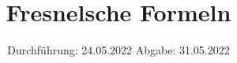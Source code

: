 

\subject{V407}
\title{Fresnelsche Formeln}
\date{%
  Durchführung: 24.05.2022
  \hspace{3em}
  Abgabe: 31.05.2022
}



\maketitle
\thispagestyle{empty}
\tableofcontents
\newpage






\printbibliography{}

%


